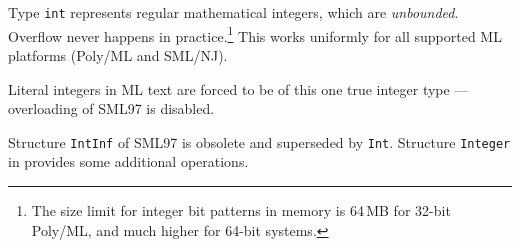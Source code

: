 \begin{isabellebody}
\begin{isamarkuptext}
  \begin{description}

  \item Type \verb|int| represents regular mathematical integers,
  which are \emph{unbounded}.  Overflow never happens in
  practice.\footnote{The size limit for integer bit patterns in memory
  is 64\,MB for 32-bit Poly/ML, and much higher for 64-bit systems.}
  This works uniformly for all supported ML platforms (Poly/ML and
  SML/NJ).

  Literal integers in ML text are forced to be of this one true
  integer type --- overloading of SML97 is disabled.

  Structure \verb|IntInf| of SML97 is obsolete and superseded by
  \verb|Int|.  Structure \verb|Integer| in \hyperlink{file.~~/src/Pure/General/integer.ML}{\mbox{}} provides some additional
  operations.


\end{description}
\end{isamarkuptext}
\end{isabellebody}
